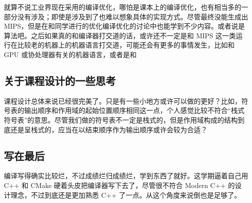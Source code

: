 \documentclass[a4paper]{article}
\begin{document}
		就算不说工业界现在采用的编译优化，哪怕是课本上的编译优化，也有相当多的一部分没有涉及；即使是涉及到了也难以想象具体的实现方式。尽管最终没能生成出 MIPS，但是在和同学进行的优化编译优化的讨论中也能学到不少内容。或者说是算法吧。之后如果真的和编译器打交道的话，或许还不一定是和 MIPS 这一类运行在比较老的机器上的机器语言打交道，可能还会有更多的事情发生，比如和 GPU 或协处理器有关的机器语言，或者是和
		
	\subsection{关于课程设计的一些思考}
	
		课程设计总体来说已经很完美了。只是有一些小地方或许可以做的更好？比如，符号表的输出顺序和作用域的起始位置顺序相同这一点，个人感觉比较不符合“栈式符号表”的意思。尽管我们做的符号表不一定是栈式的，但是作用域构成的结构到底还是呈栈式的，应当在以结束顺序作为输出顺序或许会较为合适？
		
	\subsection{写在最后}
	
		编译写得确实比较烂，不过成绩烂归成绩烂，学到东西了就好。这学期逼着自己用 C++ 和 CMake 硬着头皮把编译器写下去了，尽管很不符合 Modern C++ 的设计理念，不过到底还是更加熟悉 C++ 了一点。从这个角度来说倒也是足够了。
	
\end{document}
